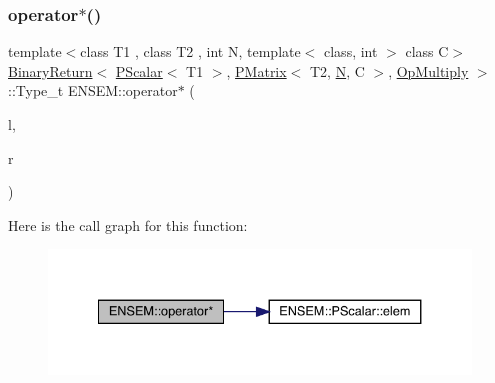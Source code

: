 \subsubsection{\texorpdfstring{operator$\ast$()}{operator*()}\hspace{0.1cm}{\footnotesize\ttfamily [2/3]}}
{\footnotesize\ttfamily template$<$class T1 , class T2 , int N, template$<$ class, int $>$ class C$>$ \\
\mbox{\hyperlink{structENSEM_1_1BinaryReturn}{Binary\+Return}}$<$ \mbox{\hyperlink{classENSEM_1_1PScalar}{P\+Scalar}}$<$ T1 $>$, \mbox{\hyperlink{classENSEM_1_1PMatrix}{P\+Matrix}}$<$ T2, \mbox{\hyperlink{adat__devel_2lib_2hadron_2operator__name__util_8cc_a7722c8ecbb62d99aee7ce68b1752f337}{N}}, C $>$, \mbox{\hyperlink{structENSEM_1_1OpMultiply}{Op\+Multiply}} $>$\+::Type\+\_\+t E\+N\+S\+E\+M\+::operator$\ast$ (\begin{DoxyParamCaption}\item[{const \mbox{\hyperlink{classENSEM_1_1PScalar}{P\+Scalar}}$<$ T1 $>$ \&}]{l,  }\item[{const \mbox{\hyperlink{classENSEM_1_1PMatrix}{P\+Matrix}}$<$ T2, \mbox{\hyperlink{adat__devel_2lib_2hadron_2operator__name__util_8cc_a7722c8ecbb62d99aee7ce68b1752f337}{N}}, C $>$ \&}]{r }\end{DoxyParamCaption})\hspace{0.3cm}{\ttfamily [inline]}}

Here is the call graph for this function\+:\nopagebreak
\begin{figure}[H]
\begin{center}
\leavevmode
\includegraphics[width=334pt]{df/d0a/group__primmatrix_ga2f9521924540b40d00ad4aa1606bfb22_cgraph}
\end{center}
\end{figure}
\mbox{\label{group__primmatrix_ga8f46104c9d9d10301141fdd1c0546a36}} 
